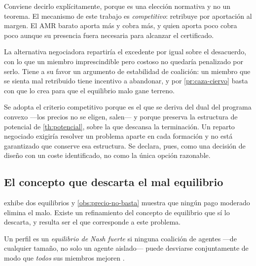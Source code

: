 \begin{observacion}
\label{obs:criterio-reparto}
Conviene decirlo explícitamente, porque es una elección normativa y no un
teorema. El mecanismo de este trabajo es \emph{competitivo}: retribuye por
aportación al margen. El AMR barato aporta más y cobra más, y quien aporta poco
cobra poco aunque su presencia fuera necesaria para alcanzar el certificado.

La alternativa negociadora repartiría el excedente por igual sobre el
desacuerdo, con lo que un miembro imprescindible pero costoso no quedaría
penalizado por serlo. Tiene a su favor un argumento de estabilidad de coalición:
un miembro que se sienta mal retribuido tiene incentivo a abandonar, y por
\cref{pr:caza-ciervo} basta con que lo crea para que el equilibrio malo gane
terreno.

Se adopta el criterio competitivo porque es el que se deriva del dual del
programa convexo —los precios no se eligen, salen— y porque preserva la
estructura de potencial de \cref{th:potencial}, sobre la que descansa la
terminación. Un reparto negociado exigiría resolver un problema aparte en cada
formación y no está garantizado que conserve esa estructura. Se declara, pues,
como una decisión de diseño con un coste identificado, no como la única opción
razonable.
\end{observacion}

\subsection{El concepto que descarta el mal equilibrio}

 exhibe dos equilibrios y \cref{obs:precio-no-basta}
muestra que ningún pago moderado elimina el malo. Existe un refinamiento del
concepto de equilibrio que sí lo descarta, y resulta ser el que corresponde a
este problema.

\begin{definicion}
\label{def:fuerte}
Un perfil es un \emph{equilibrio de Nash fuerte} si ninguna coalición de agentes
—de cualquier tamaño, no solo un agente aislado— puede desviarse conjuntamente
de modo que \emph{todos} sus miembros mejoren \cite{clempner2024optimization}.
\end{definicion}

